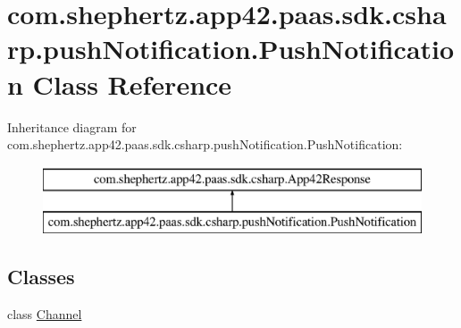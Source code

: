 \hypertarget{classcom_1_1shephertz_1_1app42_1_1paas_1_1sdk_1_1csharp_1_1push_notification_1_1_push_notification}{\section{com.\+shephertz.\+app42.\+paas.\+sdk.\+csharp.\+push\+Notification.\+Push\+Notification Class Reference}
\label{classcom_1_1shephertz_1_1app42_1_1paas_1_1sdk_1_1csharp_1_1push_notification_1_1_push_notification}
}
Inheritance diagram for com.\+shephertz.\+app42.\+paas.\+sdk.\+csharp.\+push\+Notification.\+Push\+Notification\+:\begin{figure}[H]
\begin{center}
\leavevmode
\includegraphics[height=2.000000cm]{classcom_1_1shephertz_1_1app42_1_1paas_1_1sdk_1_1csharp_1_1push_notification_1_1_push_notification}
\end{center}
\end{figure}
\subsection*{Classes}
\begin{DoxyCompactItemize}
\item 
class \hyperlink{classcom_1_1shephertz_1_1app42_1_1paas_1_1sdk_1_1csharp_1_1push_notification_1_1_push_notification_1_1_channel}{Channel}
\end{DoxyCompactItemize}
